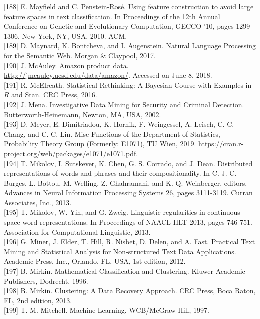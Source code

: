 \documentclass[10pt]{book}
\begin{document}
[188] E. Mayfield and C. Penstein-Rosé. Using feature construction to avoid large feature spaces in text classification. In Proceedings of the 12th Annual Conference on Genetic and Evolutionary Computation, GECCO '10, pages 1299-1306, New York, NY, USA, 2010. ACM.\\[0pt]
[189] D. Maynard, K. Bontcheva, and I. Augenstein. Natural Language Processing for the Semantic Web. Morgan \& Claypool, 2017.\\[0pt]
[190] J. McAuley. Amazon product data. \href{http://jmcauley.ucsd.edu/data/amazon/}{http://jmcauley.ucsd.edu/data/amazon/}. Accessed on June 8, 2018.\\[0pt]
[191] R. McElreath. Statistical Rethinking: A Bayesian Course with Examples in $R$ and Stan. CRC Press, 2016.\\[0pt]
[192] J. Mena. Investigative Data Mining for Security and Criminal Detection. Butterworth-Heinemann, Newton, MA, USA, 2002.\\[0pt]
[193] D. Meyer, E. Dimitriadou, K. Hornik, F. Weingessel, A. Leisch, C.-C. Chang, and C.-C. Lin. Misc Functions of the Department of Statistics, Probability Theory Group (Formerly: E1071), TU Wien, 2019. \href{https://cran.r-project.org/web/packages/e1071/e1071.pdf}{https://cran.r-project.org/web/packages/e1071/e1071.pdf}.\\[0pt]
[194] T. Mikolov, I. Sutskever, K. Chen, G. S. Corrado, and J. Dean. Distributed representations of words and phrases and their compositionality. In C. J. C. Burges, L. Bottou, M. Welling, Z. Ghahramani, and K. Q. Weinberger, editors, Advances in Neural Information Processing Systems 26, pages 3111-3119. Curran Associates, Inc., 2013.\\[0pt]
[195] T. Mikolov, W. Yih, and G. Zweig. Linguistic regularities in continuous space word representations. In Proceedings of NAACL-HLT 2013, pages 746-751. Association for Computational Linguistic, 2013.\\[0pt]
[196] G. Miner, J. Elder, T. Hill, R. Nisbet, D. Delen, and A. Fast. Practical Text Mining and Statistical Analysis for Non-structured Text Data Applications. Academic Press, Inc., Orlando, FL, USA, 1st edition, 2012.\\[0pt]
[197] B. Mirkin. Mathematical Classification and Clustering. Kluwer Academic Publishers, Dodrecht, 1996.\\[0pt]
[198] B. Mirkin. Clustering: A Data Recovery Approach. CRC Press, Boca Raton, FL, 2nd edition, 2013.\\[0pt]
[199] T. M. Mitchell. Machine Learning. WCB/McGraw-Hill, 1997.\\[0pt]
\end{document}
